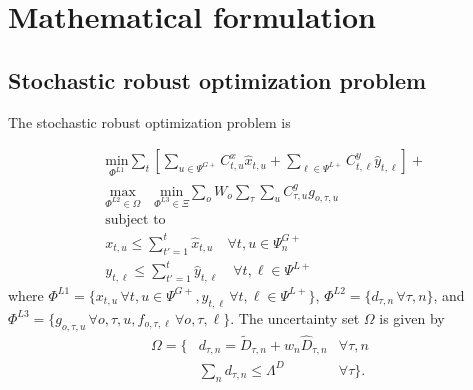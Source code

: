 \section{Mathematical formulation}
\label{section_formulation}

\subsection{Stochastic robust optimization problem}

The stochastic robust optimization problem is

\begin{align}
&\label{saro_obj} \underset{\Phi^{L1}}{\text{min}} \sum\limits_{t} \left[ \sum\limits_{u \in \Psi^{G+}} C^x_{t, u} \hat{x}_{t, u} + \sum\limits_{\ell \in \Psi^{L+}} C^y_{t, \ell} \hat{y}_{t, \ell} \right] +  \\
&\underset{\Phi^{L2} \in \Omega}{\text{max}} \quad \underset{\Phi^{L3} \in \Xi}{\text{min}} \sum\limits_o W_o \sum\limits_{\tau} \sum\limits_{u} C^g_{\tau, u} g_{o, \tau, u} \\
&\text{subject to} \nonumber \\
&\label{master_constraint_first} x_{t, u} \leq \sum\limits_{t' = 1}^{t} \hat{x}_{t, u} 	\quad \forall t, u \in \Psi_n^{G+} \\
&\label{master_constraint_last} y_{t, \ell} \leq \sum\limits_{t' = 1}^{t} \hat{y}_{t, \ell} 	\quad \forall t, \ell \in \Psi^{L+}
\end{align}
where $\Phi^{L1} = \{ x_{t, u} \, \forall t, u \in  \Psi^{G+}, y_{t, \ell} \, \forall t, \ell \in  \Psi^{L+} \}$, $\Phi^{L2} = \{ d_{\tau, n} \, \forall \tau, n \}$, and $\Phi^{L3} = \{ g_{o, \tau, u} \, \forall o, \tau, u, f_{o, \tau, \ell} \, \forall o, \tau, \ell \}$. The uncertainty set $\Omega$ is given by
\begin{align}
\Omega = \{ &d_{\tau, n} = \tilde{D}_{\tau, n} + w_n \hat{D}_{\tau, n} & \forall \tau, n \nonumber \\
\label{uncertainty_set}&\sum\limits_n d_{\tau, n} \leq \Lambda^D & \forall \tau \}.
\end{align}

